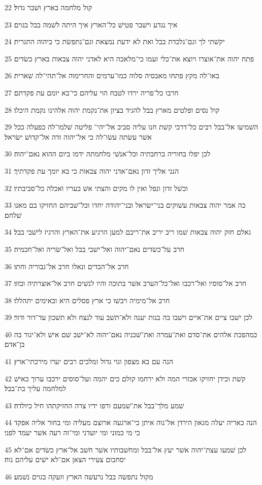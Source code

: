 \par 22 קול מלחמה בארץ ושׁבר גדול׃
\par 23 איך נגדע וישׁבר פטישׁ כל־הארץ איך היתה לשׁמה בבל בגוים׃
\par 24 יקשׁתי לך וגם־נלכדת בבל ואת לא ידעת נמצאת וגם־נתפשׂת כי ביהוה התגרית׃
\par 25 פתח יהוה את־אוצרו ויוצא את־כלי זעמו כי־מלאכה היא לאדני יהוה צבאות בארץ כשׂדים׃
\par 26 באו־לה מקץ פתחו מאבסיה סלוה כמו־ערמים והחרימוה אל־תהי־לה שׁארית׃
\par 27 חרבו כל־פריה ירדו לטבח הוי עליהם כי־בא יומם עת פקדתם׃
\par 28 קול נסים ופלטים מארץ בבל להגיד בציון את־נקמת יהוה אלהינו נקמת היכלו׃
\par 29 השׁמיעו אל־בבל רבים כל־דרכי קשׁת חנו עליה סביב אל־יהי־ פליטה שׁלמו־לה כפעלה ככל אשׁר עשׂתה עשׂו־לה כי אל־יהוה זדה אל־קדושׁ ישׂראל׃
\par 30 לכן יפלו בחוריה ברחבתיה וכל־אנשׁי מלחמתה ידמו ביום ההוא נאם־יהוה׃
\par 31 הנני אליך זדון נאם־אדני יהוה צבאות כי בא יומך עת פקדתיך׃
\par 32 וכשׁל זדון ונפל ואין לו מקים והצתי אשׁ בעריו ואכלה כל־סביבתיו׃
\par 33 כה אמר יהוה צבאות עשׁוקים בני־ישׂראל ובני־יהודה יחדו וכל־שׁביהם החזיקו בם מאנו שׁלחם׃
\par 34 גאלם חזק יהוה צבאות שׁמו ריב יריב את־ריבם למען הרגיע את־הארץ והרגיז לישׁבי בבל׃
\par 35 חרב על־כשׂדים נאם־יהוה ואל־ישׁבי בבל ואל־שׂריה ואל־חכמיה׃
\par 36 חרב אל־הבדים ונאלו חרב אל־גבוריה וחתו׃
\par 37 חרב אל־סוסיו ואל־רכבו ואל־כל־הערב אשׁר בתוכה והיו לנשׁים חרב אל־אוצרתיה ובזזו׃
\par 38 חרב אל־מימיה ויבשׁו כי ארץ פסלים היא ובאימים יתהללו׃
\par 39 לכן ישׁבו ציים את־איים וישׁבו בה בנות יענה ולא־תשׁב עוד לנצח ולא תשׁכון עד־דור ודור׃
\par 40 כמהפכת אלהים את־סדם ואת־עמרה ואת־שׁכניה נאם־יהוה לא־ישׁב שׁם אישׁ ולא־יגור בה בן־אדם׃
\par 41 הנה עם בא מצפון וגוי גדול ומלכים רבים יערו מירכתי־ארץ׃
\par 42 קשׁת וכידן יחזיקו אכזרי המה ולא ירחמו קולם כים יהמה ועל־סוסים ירכבו ערוך כאישׁ למלחמה עליך בת־בבל׃
\par 43 שׁמע מלך־בבל את־שׁמעם ורפו ידיו צרה החזיקתהו חיל כיולדה׃
\par 44 הנה כאריה יעלה מגאון הירדן אל־נוה איתן כי־ארגעה ארוצם מעליה ומי בחור אליה אפקד כי מי כמוני ומי יועדני ומי־זה רעה אשׁר יעמד לפני׃
\par 45 לכן שׁמעו עצת־יהוה אשׁר יעץ אל־בבל ומחשׁבותיו אשׁר חשׁב אל־ארץ כשׂדים אם־לא יסחבום צעירי הצאן אם־לא ישׁים עליהם נוה׃
\par 46 מקול נתפשׂה בבל נרעשׁה הארץ וזעקה בגוים נשׁמע׃

